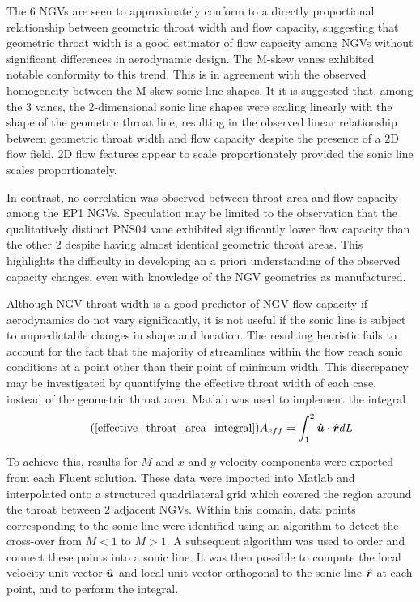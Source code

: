 \documentclass[a4paper, 11pt, oneside]{report}
\begin{document}
The 6 NGVs are seen to approximately conform to a directly proportional relationship between geometric throat width and flow capacity, suggesting that geometric throat width is a good estimator of flow capacity among NGVs without significant differences in aerodynamic design. The M-skew vanes exhibited notable conformity to this trend. This is in agreement with the observed homogeneity between the M-skew sonic line shapes. It it is suggested that, among the 3 vanes, the 2-dimensional sonic line shapes were scaling linearly with the shape of the geometric throat line, resulting in the observed linear relationship between geometric throat width and flow capacity despite the presence of a 2D flow field. 2D flow features appear to scale proportionately provided the sonic line scales proportionately.

In contrast, no correlation was observed between throat area and flow capacity among the EP1 NGVs. Speculation may be limited to the observation that the qualitatively distinct PNS04 vane exhibited significantly lower flow capacity than the other 2 despite having almost identical geometric throat areas. This highlights the difficulty in developing an a priori understanding of the observed capacity changes, even with knowledge of the NGV geometries as manufactured.

Although NGV throat width is a good predictor of NGV flow capacity if aerodynamics do not vary significantly, it is not useful if the sonic line is subject to unpredictable changes in shape and location. The resulting heuristic fails to account for the fact that the majority of streamlines within the flow reach sonic conditions at a point other than their point of minimum width. This discrepancy may be investigated by quantifying the effective throat width of each case, instead of the geometric throat area. Matlab was used to implement the integral
\begin{equation}\tag{\ref{effective_throat_area_integral}}
	A_{eff} = 
	\int_{1}^2 \vu*{u} \vdot \vu*{r} dL
\end{equation}

To achieve this, results for $M$ and $x$ and $y$ velocity components were exported from each Fluent solution. These data were imported into Matlab and interpolated onto a structured quadrilateral grid which covered the region around the throat between 2 adjacent NGVs. Within this domain, data points corresponding to the sonic line were identified using an algorithm to detect the cross-over from $M<1$ to $M>1$. A subsequent algorithm was used to order and connect these points into a sonic line. It was then possible to compute the local velocity unit vector $\vu*{u}$ and local unit vector orthogonal to the sonic line $\vu*{r}$ at each point, and to perform the integral. 
\end{document}
